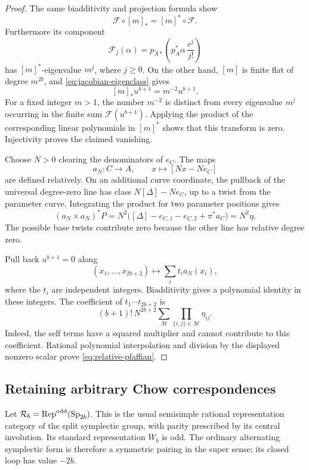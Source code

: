 \begin{proof}
The same biadditivity and projection formula show
\[
 \mathcal F\circ[m]_*
   =[m]^*\circ\mathcal F.
\]
Furthermore its component
\[
 \mathcal F_j(\alpha)=
 p_{\widehat A*}\left(p_A^*\alpha\,\frac{c^j}{j!}\right)
\]
has \([m]^*\)-eigenvalue \(m^j\), where \(j\ge0\).
On the other hand, \([m]\) is finite flat of degree \(m^{2b}\), and
\eqref{eq:jacobian-eigenclass} gives
\[
 [m]_*u^{b+1}=m^{-2}u^{b+1}.
\]
For a fixed integer \(m>1\), the number \(m^{-2}\) is distinct from
every eigenvalue \(m^j\) occurring in the finite sum
\(\mathcal F(u^{b+1})\).  Applying the product of the corresponding
linear polynomials in \([m]^*\) shows that this transform is zero.
Injectivity proves the claimed vanishing.

Choose \(N>0\) clearing the denominators of \(e_C\).  The maps
\[
 a_N\colon C\longrightarrow A,\qquad
 x\longmapsto[Nx-Ne_C]
\]
are defined relatively.  On an additional curve coordinate, the
pullback of the universal degree-zero line has class
\(N[\Delta]-Ne_C\), up to a twist from the parameter curve.
Integrating the product for two parameter positions gives
\begin{equation}
 \label{eq:abel-jacobi-cross-term}
 (a_N\times a_N)^*P
 =N^2\bigl([\Delta]-e_{C,1}-e_{C,2}+\pi^*a_C\bigr)
 =N^2\eta.
\end{equation}
The possible base twists contribute zero because the other line has
relative degree zero.

Pull back \(u^{b+1}=0\) along
\[
 (x_1,\ldots,x_{2b+2})
 \longmapsto\sum_i t_i a_N(x_i),
\]
where the \(t_i\) are independent integers.  Biadditivity gives a
polynomial identity in these integers.  The coefficient of
\(t_1\cdots t_{2b+2}\) is
\[
 (b+1)!\,N^{2b+2}
 \sum_{\mathcal M}\prod_{\{i,j\}\in\mathcal M}\eta_{ij}.
\]
Indeed, the self terms have a squared multiplier and cannot
contribute to this coefficient.  Rational polynomial interpolation
and division by the displayed nonzero scalar prove
\eqref{eq:relative-pfaffian}.
\end{proof}

\subsection{Retaining arbitrary Chow correspondences}

Let \(\mathcal R_b=\operatorname{Rep}^{\mathrm{odd}}(\operatorname{Sp}_{2b})\).
This is the usual semisimple rational representation category of the
split symplectic group, with parity prescribed by its central
involution.  Its standard representation \(W_b\) is odd.  The ordinary
alternating symplectic form is therefore a symmetric pairing in the
super sense; its closed loop has value \(-2b\).

